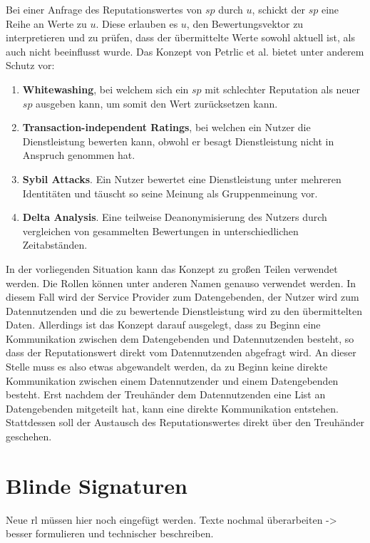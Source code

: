 \documentclass[11pt,a4paper]{scrreprt}
\begin{document}
Bei einer Anfrage des Reputationswertes von $sp$ durch $u$, schickt der $sp$ eine Reihe an Werte zu $u$. Diese erlauben es $u$, den Bewertungsvektor zu interpretieren und zu prüfen, dass der übermittelte Werte sowohl aktuell ist, als auch nicht beeinflusst wurde. 
Das Konzept von Petrlic et al. bietet unter anderem Schutz vor: 
\begin{enumerate}
    \item \textbf{Whitewashing}, bei welchem sich ein $sp$ mit schlechter Reputation als neuer $sp$ ausgeben kann, um somit den Wert zurücksetzen kann.
    \item \textbf{Transaction-independent Ratings}, bei welchen ein Nutzer die Dienstleistung bewerten kann, obwohl er besagt Dienstleistung nicht in Anspruch genommen hat.
    \item \textbf{Sybil Attacks}. Ein Nutzer bewertet eine Dienstleistung unter mehreren Identitäten und täuscht so seine Meinung als Gruppenmeinung vor.
    \item \textbf{Delta Analysis}. Eine teilweise Deanonymisierung des Nutzers durch vergleichen von gesammelten Bewertungen in unterschiedlichen Zeitabständen.
\end{enumerate} 
In der vorliegenden Situation kann das Konzept zu großen Teilen verwendet werden. Die Rollen können unter anderen Namen genauso verwendet werden. In diesem Fall wird der Service Provider zum Datengebenden, der Nutzer wird zum Datennutzenden und die zu bewertende Dienstleistung wird zu den übermittelten Daten. Allerdings ist das Konzept darauf ausgelegt, dass zu Beginn eine Kommunikation zwischen dem Datengebenden und Datennutzenden besteht, so dass der Reputationswert direkt vom Datennutzenden abgefragt wird. An dieser Stelle muss es also etwas abgewandelt werden, da zu Beginn keine direkte Kommunikation zwischen einem Datennutzender und einem Datengebenden besteht. Erst nachdem der Treuhänder dem Datennutzenden eine List an Datengebenden mitgeteilt hat, kann eine direkte Kommunikation entstehen. Stattdessen soll der Austausch des Reputationswertes  direkt über den Treuhänder geschehen.

\section{Blinde Signaturen}
\label{sec:blindSig}
Neue rl müssen hier noch eingefügt werden. Texte nochmal überarbeiten -> besser formulieren und technischer beschreiben.
\end{document}
